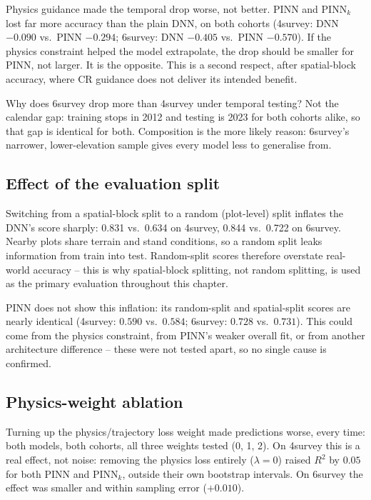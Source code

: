 Physics guidance made the temporal drop worse, not better. PINN and PINN$_k$ lost far more
accuracy than the plain DNN, on both cohorts (4survey: DNN $-0.090$ vs.\ PINN $-0.294$; 6survey:
DNN $-0.405$ vs.\ PINN $-0.570$). If the physics constraint helped the model extrapolate, the drop
should be smaller for PINN, not larger. It is the opposite. This is a second respect, after
spatial-block accuracy, where CR guidance does not deliver its intended benefit.

Why does 6survey drop more than 4survey under temporal testing? Not the calendar gap: training
stops in 2012 and testing is 2023 for both cohorts alike, so that gap is identical for both.
Composition is the more likely reason: 6survey's narrower, lower-elevation sample gives every
model less to generalise from.


\subsection{Effect of the evaluation split}

Switching from a spatial-block split to a random (plot-level) split inflates the DNN's score
sharply: 0.831 vs.\ 0.634 on 4survey, 0.844 vs.\ 0.722 on 6survey. Nearby plots share terrain and
stand conditions, so a random split leaks information from train into test. Random-split scores
therefore overstate real-world accuracy -- this is why spatial-block splitting, not random
splitting, is used as the primary evaluation throughout this chapter.

PINN does not show this inflation: its random-split and spatial-split scores are nearly identical
(4survey: $0.590$ vs.\ $0.584$; 6survey: $0.728$ vs.\ $0.731$). This could come from the physics
constraint, from PINN's weaker overall fit, or from another architecture difference -- these were
not tested apart, so no single cause is confirmed.


\subsection{Physics-weight ablation}

Turning up the physics/trajectory loss weight made predictions worse, every time: both models,
both cohorts, all three weights tested (0, 1, 2). On 4survey this is a real effect, not noise:
removing the physics loss entirely ($\lambda=0$) raised $R^2$ by $0.05$ for both PINN and
PINN$_k$, outside their own bootstrap intervals. On 6survey the effect was smaller and within
sampling error ($+0.010$).

